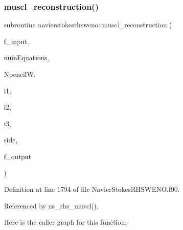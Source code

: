 \subsubsection{\texorpdfstring{muscl\+\_\+reconstruction()}{muscl\_reconstruction()}}
{\footnotesize\ttfamily subroutine navierstokesrhsweno\+::muscl\+\_\+reconstruction (\begin{DoxyParamCaption}\item[{real(kind=8), dimension(npencilw,numequations)}]{f\+\_\+input,  }\item[{integer(kind=4)}]{num\+Equations,  }\item[{integer(kind=4)}]{NpencilW,  }\item[{integer(kind=4)}]{i1,  }\item[{integer(kind=4)}]{i2,  }\item[{integer(kind=4)}]{i3,  }\item[{real(kind=8)}]{side,  }\item[{real(kind=8), dimension(numequations)}]{f\+\_\+output }\end{DoxyParamCaption})}



Definition at line 1794 of file Navier\+Stokes\+R\+H\+S\+W\+E\+N\+O.\+f90.



Referenced by ns\+\_\+rhs\+\_\+muscl().

Here is the caller graph for this function\+:
\hypertarget{namespacenavierstokesrhsweno_a6a6c17f009939c4d47bb3c856785e8c1}{}\label{namespacenavierstokesrhsweno_a6a6c17f009939c4d47bb3c856785e8c1} 
